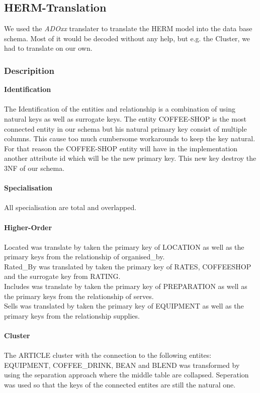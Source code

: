 \clearpage
\subsection{HERM-Translation}
We used the \textit{ADOxx} translater to translate the HERM model into the data base schema. Most of it would be decoded without any help, but e.g. the Cluster, we had to translate on our own.
\subsubsection{Descripition}
\textbf{Identification}\\\\
The Identification of the entities and relationship is a combination of using natural keys as well as surrogate keys. 
The entity COFFEE-SHOP is the most connected entity in our schema but his natural primary key consist of multiple columns. This cause too much cumbersome workarounds to keep the key natural. For that reason the COFFEE-SHOP entity will have in the implementation another attribute id which will be the new primary key. This new key destroy the 3NF of our schema.\\\\
\textbf{Specialisation}\\\\
All specialisation are total and overlapped. \\\\
\textbf{Higher-Order}\\\\
Located was translate by taken the primary key  of LOCATION as well as the primary keys from the relationship of organised\_by.\\
Rated\_By was translated by taken the primary key of RATES, COFFEESHOP and the surrogate key from RATING.\\
Includes was translate by taken the primary key of PREPARATION as well as the primary keys from the relationship of serves.\\
Sells was translated by taken the primary key of EQUIPMENT as well as the primary keys from the relationship supplies.\\\\ 
\textbf{Cluster}\\\\
The ARTICLE cluster with the connection to the following entites: EQUIPMENT, COFFEE\_DRINK, BEAN and BLEND was transformed by using the separation approach where the middle table are collapsed. Seperation was used so that the keys of the connected entites are still the natural one. \\

